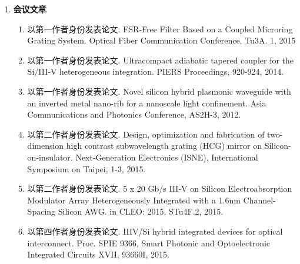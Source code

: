 \begin{publications}
\begin{enumerate}[]
	\item \textbf{会议文章}
	\begin{enumerate}[1.]
		\item 以第一作者身份发表论文. FSR-Free Filter Based on a Coupled Microring Grating System. Optical Fiber Communication Conference, Tu3A. 1, 2015 
		\item 以第一作者身份发表论文. Ultracompact adiabatic tapered coupler for the Si/III-V heterogeneous integration. PIERS Proceedings, 920-924, 2014.
		\item 以第一作者身份发表论文. Novel silicon hybrid plasmonic waveguide with an inverted metal nano-rib for a nanoscale light confinement. Asia Communications and Photonics Conference, AS2H-3, 2012.
		\item 以第二作者身份发表论文. Design, optimization and fabrication of two-dimension high contrast subwavelength grating (HCG) mirror on Silicon-on-insulator. Next-Generation Electronics (ISNE), International Symposium on Taipei, 1-3, 2015.
		\item 以第二作者身份发表论文. 5 x 20 Gb/s III-V on Silicon Electroabsorption Modulator Array Heterogeneously Integrated with a 1.6nm Channel-Spacing Silicon AWG. in CLEO: 2015, STu4F.2, 2015.		
		\item 以第四作者身份发表论文. IIIV/Si hybrid integrated devices for optical interconnect. Proc. SPIE 9366, Smart Photonic and Optoelectronic Integrated Circuits XVII, 93660I, 2015.
	\end{enumerate}
\end{enumerate}
\end{publications}
